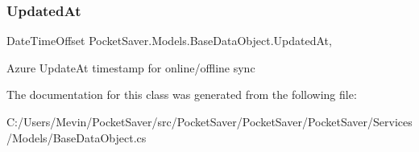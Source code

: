 \subsubsection{\texorpdfstring{Updated\+At}{UpdatedAt}}
{\footnotesize\ttfamily Date\+Time\+Offset Pocket\+Saver.\+Models.\+Base\+Data\+Object.\+Updated\+At\hspace{0.3cm}{\ttfamily [get]}, {\ttfamily [set]}}



Azure Update\+At timestamp for online/offline sync 



The documentation for this class was generated from the following file\+:\begin{DoxyCompactItemize}
\item 
C\+:/\+Users/\+Mevin/\+Pocket\+Saver/src/\+Pocket\+Saver/\+Pocket\+Saver/\+Pocket\+Saver/\+Services/\+Models/Base\+Data\+Object.\+cs\end{DoxyCompactItemize}
